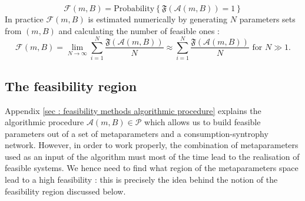 \documentclass[12pt, titlepage]{report}
\begin{document}
\begin{equation}\boxed{
\mathcal{F}(m, B)=\text{Probability}\left\{\mathfrak{F}\left(\mathcal{A}(m, B)\right)=1\right\} \label{eq : feasibility methods feasibility metaparameters function}
}
\end{equation}
In practice $\mathcal{F}(m, B)$ is estimated numerically by generating $N$ parameters sets from $(m,B)$ and calculating the number of feasible ones :
\begin{equation}
\mathcal{F}(m, B) = \lim_{N\rightarrow \infty} \sum_{i=1}^N \frac{\mathfrak{F}(\mathcal{A}(m,B))}{N} \approx \sum_{i=1}^N \frac{\mathfrak{F}(\mathcal{A}(m,B))}{N} \text{ for } N \gg 1.
\end{equation}

\subsection{The feasibility region}\label{sec : methods feasibility volume}
Appendix \ref{sec : feasibility methods algorithmic procedure} explains the algorithmic procedure $\mathcal{A}(m, B) \in \mathcal{P}$ which allows us to build feasible parameters out of a set of metaparameters and a consumption-syntrophy network. However, in order to work properly, the combination of metaparameters used as an input of the algorithm must most of the time lead to the realisation of feasible systems. We hence need to find what region of the metaparameters space lead to a high feasibility : this is precisely the idea behind the notion of the feasibility region discussed below.
\end{document}
